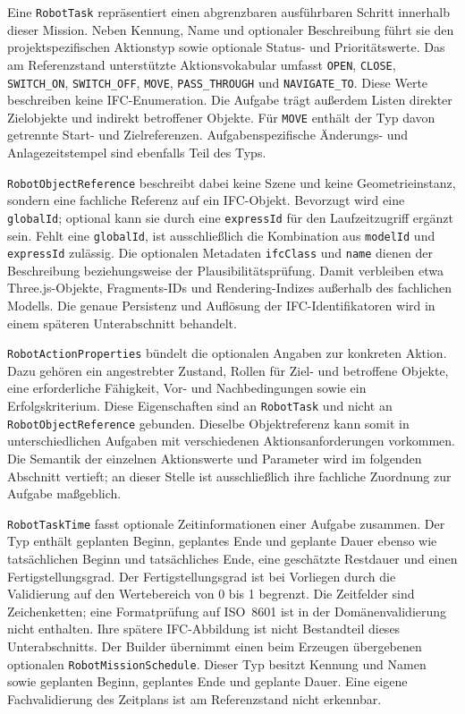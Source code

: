 Eine \texttt{RobotTask} repräsentiert einen abgrenzbaren ausführbaren Schritt innerhalb dieser Mission. Neben Kennung,
Name und optionaler Beschreibung führt sie den projektspezifischen Aktionstyp sowie optionale Status- und
Prioritätswerte. Das am Referenzstand unterstützte Aktionsvokabular umfasst \texttt{OPEN}, \texttt{CLOSE},
\texttt{SWITCH\_ON}, \texttt{SWITCH\_OFF}, \texttt{MOVE}, \texttt{PASS\_THROUGH} und \texttt{NAVIGATE\_TO}. Diese Werte
beschreiben keine IFC-Enumeration. Die Aufgabe trägt außerdem Listen direkter Zielobjekte und indirekt betroffener
Objekte. Für \texttt{MOVE} enthält der Typ davon getrennte Start- und Zielreferenzen. Aufgabenspezifische Änderungs- und
Anlagezeitstempel sind ebenfalls Teil des Typs.

\texttt{RobotObjectReference} beschreibt dabei keine Szene und keine Geometrieinstanz, sondern eine fachliche Referenz
auf ein IFC-Objekt. Bevorzugt wird eine \texttt{globalId}; optional kann sie durch eine \texttt{expressId} für den
Laufzeitzugriff ergänzt sein. Fehlt eine \texttt{globalId}, ist ausschließlich die Kombination aus \texttt{modelId} und
\texttt{expressId} zulässig. Die optionalen Metadaten \texttt{ifcClass} und \texttt{name} dienen der Beschreibung
beziehungsweise der Plausibilitätsprüfung. Damit verbleiben etwa Three.js-Objekte, Fragments-IDs und Rendering-Indizes
außerhalb des fachlichen Modells. Die genaue Persistenz und Auflösung der IFC-Identifikatoren wird in einem späteren
Unterabschnitt behandelt.

\texttt{RobotActionProperties} bündelt die optionalen Angaben zur konkreten Aktion. Dazu gehören ein angestrebter
Zustand, Rollen für Ziel- und betroffene Objekte, eine erforderliche Fähigkeit, Vor- und Nachbedingungen sowie ein
Erfolgskriterium. Diese Eigenschaften sind an \texttt{RobotTask} und nicht an \texttt{RobotObjectReference} gebunden.
Dieselbe Objektreferenz kann somit in unterschiedlichen Aufgaben mit verschiedenen Aktionsanforderungen vorkommen. Die
Semantik der einzelnen Aktionswerte und Parameter wird im folgenden Abschnitt vertieft; an dieser Stelle ist
ausschließlich ihre fachliche Zuordnung zur Aufgabe maßgeblich.

\texttt{RobotTaskTime} fasst optionale Zeitinformationen einer Aufgabe zusammen. Der Typ enthält geplanten Beginn,
geplantes Ende und geplante Dauer ebenso wie tatsächlichen Beginn und tatsächliches Ende, eine geschätzte Restdauer und
einen Fertigstellungsgrad. Der Fertigstellungsgrad ist bei Vorliegen durch die Validierung auf den Wertebereich von 0 bis
1 begrenzt. Die Zeitfelder sind Zeichenketten; eine Formatprüfung auf ISO~8601 ist in der Domänenvalidierung nicht
enthalten. Ihre spätere IFC-Abbildung ist nicht Bestandteil dieses Unterabschnitts. Der Builder übernimmt einen beim
Erzeugen übergebenen optionalen \texttt{RobotMissionSchedule}. Dieser Typ besitzt Kennung und Namen sowie geplanten
Beginn, geplantes Ende und geplante Dauer. Eine eigene Fachvalidierung des Zeitplans ist am Referenzstand nicht
erkennbar.

